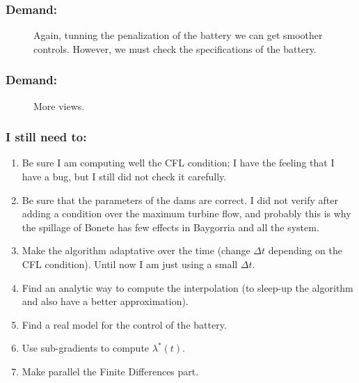 \documentclass[aspectratio=169]{beamer}\usepackage[utf8]{inputenc}
\begin{document}
\begin{frame}\frametitle{Demand:}
\begin{figure}[ht!]
\centering
{}
\caption{Again, tunning the penalization of the battery we can get smoother controls. However, we must check the specifications of the battery.}
\end{figure}
\end{frame}

\begin{frame}\frametitle{Demand:}
\begin{figure}[ht!]
\centering
{}
\caption{More views.}
\end{figure}
\end{frame}

\begin{frame}\frametitle{I still need to:}
\begin{enumerate}
\item Be sure I am computing well the CFL condition; I have the feeling that I have a bug, but I still did not check it carefully.
\item Be sure that the parameters of the dams are correct. I did not verify after adding a
condition over the maximum turbine flow, and probably this is why the spillage of
Bonete has few effects in Baygorria and all the system.
\item Make the algorithm adaptative over the time (change $\Delta t$ depending on the CFL condition). Until now I am just using a small $\Delta t$.
\item Find an analytic way to compute the interpolation (to sleep-up the algorithm and also have a better approximation).
\item Find a real model for the control of the battery.
\item Use sub-gradients to compute $\lambda^*(t)$.
\item Make parallel the Finite Differences part.
\end{enumerate}
\end{frame}
\end{document}
